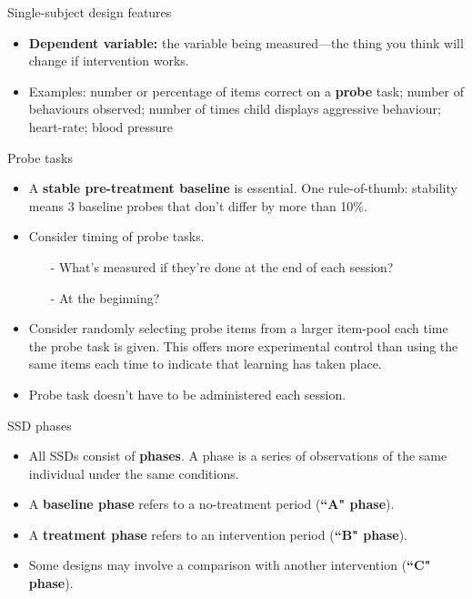 \documentclass{beamer}
\begin{document}
% 
\begin{frame}{Single-subject design features}
	\begin{itemize}
	\item \textbf{Dependent variable:} the variable being measured---the thing you think will change if intervention works.
	\item Examples: number or percentage of items correct on a \textbf{probe} task; number of behaviours observed; number of times child displays aggressive behaviour; heart-rate; blood pressure
	\end{itemize}
\end{frame}

% 
\begin{frame}{Probe tasks}
	\begin{itemize}
	\item A \textbf{stable pre-treatment baseline} is essential. One rule-of-thumb: stability means 3 baseline probes that don't differ by more than 10\%.
	\item Consider timing of probe tasks.
		\begin{itemize}
		\item[-] What's measured if they're done at the end of each session? 
		\item[-] At the beginning?
		\end{itemize}
	\item Consider randomly selecting probe items from a larger item-pool each time the probe task is given. This offers more experimental control than using the same items each time to indicate that learning has taken place.
	\item Probe task doesn't have to be administered each session.
	\end{itemize}
\end{frame}

% 
\begin{frame}{SSD phases}
	\begin{itemize}
	\item All SSDs consist of \textbf{phases}. A phase is a series of observations of the same individual under the same conditions.
	\item A \textbf{baseline phase} refers to a no-treatment period (\textbf{{``A" phase}}).  
	\item A \textbf{treatment phase} refers to an intervention period (\textbf{{``B" phase}}).
	\item Some designs may involve a comparison with another intervention (\textbf{{``C" phase}}).
	\end{itemize}
\end{frame}
\end{document}
